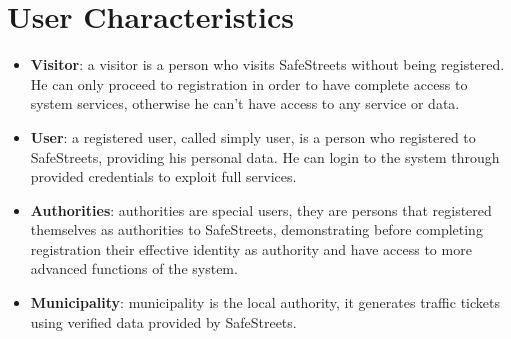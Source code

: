 \section{User Characteristics}
\begin{itemize}
  \item \textbf{Visitor}: a visitor is a person who visits SafeStreets without being registered. He can only proceed to registration in order to have complete access to system services, otherwise he can't have access to any service or data.
  \item \textbf{User}: a registered user, called simply user, is a person who registered to SafeStreets, providing his personal data. He can login to the system through provided credentials to exploit full services.
  \item \textbf{Authorities}: authorities are special users, they are persons that registered themselves as authorities to SafeStreets, demonstrating before completing registration their effective identity as authority and have access to more advanced functions of the system.
  \item \textbf{Municipality}: municipality is the local authority, it generates traffic tickets using verified data provided by SafeStreets.
\end{itemize}